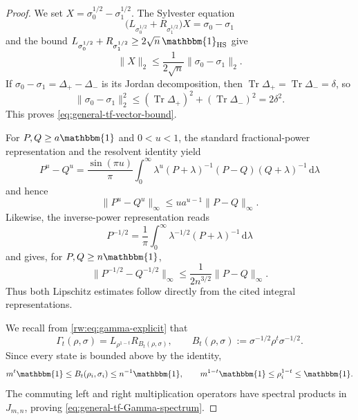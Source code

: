 \documentclass[11pt]{article}
\theoremstyle{remark}
\newcommand{\1}{\mathbbm{1}}
\begin{document}
\begin{proof}
We set $X=\sigma_0^{1/2}-\sigma_1^{1/2}$.  The Sylvester equation
\begin{equation}
 \bigl(L_{\sigma_0^{1/2}}+R_{\sigma_1^{1/2}}\bigr)X
 =\sigma_0-\sigma_1
 \label{eq:general-tf-Sylvester-equation}
\end{equation}
and the bound
$L_{\sigma_0^{1/2}}+R_{\sigma_1^{1/2}}
 \geq2\sqrt n\,\1_{\rm HS}$ give
\begin{equation}
 \lVert X\rVert_2
 \leq\frac{1}{2\sqrt n}
       \lVert\sigma_0-\sigma_1\rVert_2.
 \label{eq:general-tf-Sylvester-bound}
\end{equation}
If $\sigma_0-\sigma_1=\Delta_+-\Delta_-$ is its Jordan
decomposition, then
$\operatorname{Tr}\Delta_+=\operatorname{Tr}\Delta_-=\delta$, so
\begin{equation}
 \lVert\sigma_0-\sigma_1\rVert_2^2
 \leq(\operatorname{Tr}\Delta_+)^2
     +(\operatorname{Tr}\Delta_-)^2
 =2\delta^2.
\end{equation}
This proves \eqref{eq:general-tf-vector-bound}.

For $P,Q\geq a\1$ and $0<u<1$, the standard fractional-power
representation \cite[Eq.~(1.39), pp.~21--22]{bhatia2009positive}
and the resolvent identity yield
\begin{equation}
 P^u-Q^u
 =\frac{\sin(\pi u)}{\pi}\int_0^\infty
 \lambda^u(P+\lambda)^{-1}(P-Q)(Q+\lambda)^{-1}
 \,\mathrm d\lambda
 \label{eq:general-tf-power-resolvent}
\end{equation}
and hence
\begin{equation}
 \lVert P^u-Q^u\rVert_\infty
 \leq ua^{u-1}\lVert P-Q\rVert_\infty.
 \label{eq:general-tf-power-Lipschitz}
\end{equation}
Likewise, the inverse-power representation
\cite[Exercise~1.5.10, p.~23]{bhatia2009positive} reads
\begin{equation}
 P^{-1/2}=\frac1\pi\int_0^\infty
 \lambda^{-1/2}(P+\lambda)^{-1}\,\mathrm d\lambda
\end{equation}
and gives, for $P,Q\geq n\1$,
\begin{equation}
 \lVert P^{-1/2}-Q^{-1/2}\rVert_\infty
 \leq\frac{1}{2n^{3/2}}\lVert P-Q\rVert_\infty.
 \label{eq:general-tf-inverse-square-root}
\end{equation}
Thus both Lipschitz estimates follow directly from the cited integral
representations.

We recall from \eqref{rw:eq:gamma-explicit} that
\begin{equation}
 \Gamma_t(\rho,\sigma)
 =L_{\rho^{1-t}}R_{B_t(\rho,\sigma)},
 \qquad
 B_t(\rho,\sigma):=\sigma^{-1/2}\rho^t\sigma^{-1/2}.
 \label{eq:general-tf-Gamma-explicit}
\end{equation}
Since every state is bounded above by the identity,
\begin{equation}
 m^t\1\leq B_t(\rho_i,\sigma_i)\leq n^{-1}\1,
 \qquad
 m^{1-t}\1\leq\rho_i^{1-t}\leq\1.
\end{equation}
The commuting left and right multiplication operators have spectral
products in $J_{m,n}$, proving
\eqref{eq:general-tf-Gamma-spectrum}.


\end{proof}
\end{document}
